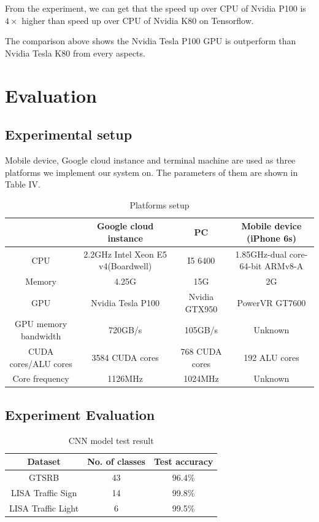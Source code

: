 \documentclass[conference]{IEEEtran}
\begin{document}
From the experiment, we can get that the speed up over CPU of Nvidia P100 is $4 \times$ higher than speed up over CPU of Nvidia K80 on Tensorflow. 

The comparison above shows the Nvidia Tesla P100 GPU is outperform than Nvidia Tesla K80 from every aspects. 

\section{Evaluation}

\subsection{Experimental setup}

Mobile device, Google cloud instance and terminal machine are used as three platforms we implement our system on. The parameters of them are shown in Table IV.  


\begin{table}
\caption{Platforms setup}
\centering
\begin{tabular}{|c|c|c|c|}
\hline
\textbf{} & \textbf{Google cloud instance}&\textbf{PC}&
\textbf{Mobile device (iPhone 6s)}\\
\hline
CPU & 2.2GHz Intel Xeon E5 v4(Boardwell) & I5 6400 & 1.85GHz-dual core-64-bit ARMv8-A \\
\hline
Memory & 4.25G & 15G & 2G\\
\hline
GPU & Nvidia Tesla P100   & Nvidia GTX950 & PowerVR GT7600 \\
\hline
GPU memory bandwidth & 720GB/s & 105GB/s & Unknown \\ 
\hline
CUDA cores/ALU cores & 3584 CUDA cores & 768 CUDA cores & 192 ALU cores \\
\hline
Core frequency & 1126MHz & 1024MHz & Unknown \\
\hline
\end{tabular}
\end{table}


\subsection{Experiment Evaluation}

\begin{table}[H]
\caption{CNN model test result}
\begin{center}
\begin{tabular}{|c|c|c|}
\hline
\textbf{Dataset} & \textbf{No. of classes}& \textbf{Test accuracy} \\
\hline
GTSRB & 43 & 96.4\% \\
\hline
LISA Traffic Sign & 14 & 99.8\% \\
\hline
LISA Traffic Light& 6 & 99.5\% \\
\hline
\end{tabular}
\label{tab3}
\end{center}
\end{table}
\end{document}
